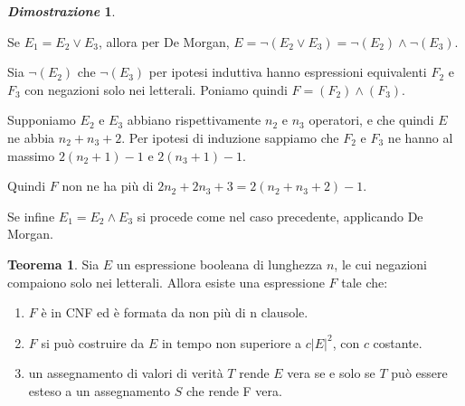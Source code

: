 \documentclass[12pt]{article}
\theoremstyle{definition}
\newtheorem*{mytheo}{Teorema}
\newtheorem*{myproof}{\em Dimostrazione}
\begin{document}
\begin{myproof}
\begin{description}
\begin{description}
        Se \(E_1 = E_2 \lor E_3\), allora per De Morgan, \(E = \lnot (E_2 \lor E_3) = \lnot (E_2) \land \lnot (E_3)\).\newline
        
        Sia \(\lnot(E_2)\) che  \(\lnot(E_3)\) per ipotesi induttiva hanno espressioni equivalenti \(F_2\) e \(F_3\) con
        negazioni solo nei letterali. Poniamo quindi \(F = (F_2) \land (F_3)\).

        Supponiamo \(E_2\) e \(E_3\) abbiano rispettivamente \(n_2\) e \(n_3\) operatori, e che quindi \(E\) ne abbia
        \(n_2 + n_3 + 2\). Per ipotesi di induzione sappiamo che \(F_2\) e \(F_3\) ne hanno al massimo  \(2(n_2 + 1) - 1\) e \(2(n_3 + 1)-1\).
        \newline

        Quindi \(F\) non ne ha pi\`u di \(2n_2 + 2n_3 + 3 = 2(n_2 + n_3 + 2) - 1\).

        Se infine \(E_1 = E_2 \land E_3\) si procede come nel caso precedente, applicando De Morgan.
        
    \end{description}

  \end{description}

  \hfill \qedsymbol
\end{myproof}

\begin{mytheo}
  Sia \(E\) un espressione booleana di lunghezza \(n\), le cui negazioni compaiono solo nei letterali.
  Allora esiste una espressione \(F\) tale che:

  \begin{enumerate}
    
    \item \(F\) \`e in CNF ed \`e formata da non pi\`u di n clausole.

    \item \(F\) si pu\`o costruire da \(E\) in tempo non superiore a \(c|E|^2\), con \(c\) costante.

    \item un assegnamento di valori di verit\`a \(T\) rende \(E\) vera se e solo se \(T\) pu\`o essere esteso
      a un assegnamento \(S\) che rende F vera.

  \end{enumerate}
\end{mytheo}
\end{document}
